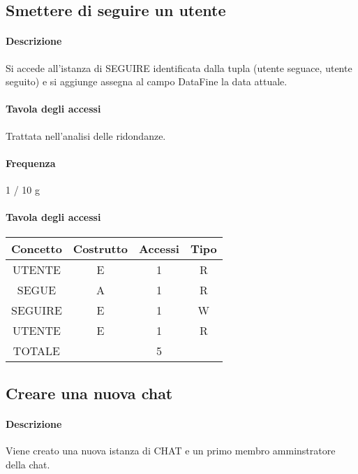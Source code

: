 \documentclass[a4paper,12pt]{report}
\begin{document}
\subsection{Smettere di seguire un utente} \label{unfollow}
\paragraph{Descrizione} Si accede all'istanza di SEGUIRE identificata dalla tupla (utente seguace, utente seguito) e si aggiunge assegna al campo DataFine la data attuale.
\paragraph{Tavola degli accessi}
Trattata nell'analisi delle ridondanze.

\paragraph{Frequenza} 1 / 10 g
\begin{table}[H]
\paragraph{Tavola degli accessi\newline}
\begin{tabular}{|c|c|c|c|}
\hline
Concetto & Costrutto & Accessi & Tipo \\ \hline
UTENTE   & E         & 1       & R    \\ \hline
SEGUE    & A         & 1       & R    \\ \hline
SEGUIRE  & E         & 1       & W    \\ \hline
UTENTE   & E         & 1       & R    \\ \hline
TOTALE   &           & 5       &      \\ \hline
\end{tabular}
\end{table}
\subsection{Creare una nuova chat} \label{nuova_chat}
\paragraph{Descrizione} Viene creato una nuova istanza di CHAT e un primo membro amminstratore della chat.
\end{document}
